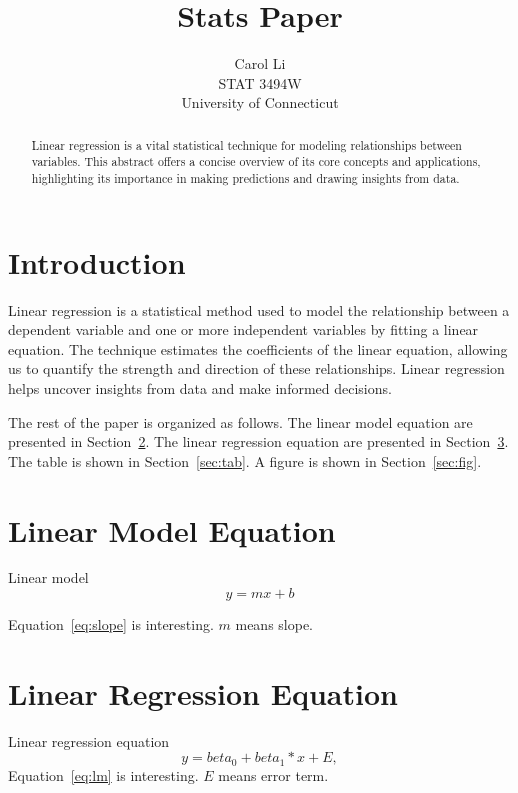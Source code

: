 \documentclass[12pt]{article}
\title{Stats Paper}
\author{Carol Li\\
    STAT 3494W\\
    University of Connecticut
}
\begin{document}

\begin{abstract}
  Linear regression is a vital statistical technique for modeling relationships between variables. 
  This abstract offers a concise overview of its core concepts and applications, highlighting its importance 
  in making predictions and drawing insights from data.
\end{abstract}


\section{Introduction}
\label{sec:intro}

Linear regression is a statistical method used to model the relationship between a dependent variable and 
one or more independent variables by fitting a linear equation. The technique estimates the coefficients of the linear 
equation, allowing us to quantify the strength and direction of these relationships. Linear regression helps uncover 
insights from data and make informed decisions.

\lipsum[1]


The rest of the paper is organized as follows.
The linear model equation are presented in Section~\ref{sec:eq}.
The linear regression equation are presented in Section~\ref{sec:eq2}.
The table is shown in Section~\ref{sec:tab}.
A figure is shown in Section~\ref{sec:fig}.


\section{Linear Model Equation}
\label{sec:eq}

Linear model
\begin{equation}
  \label{slope}
  y = mx + b
\end{equation}

Equation~\eqref{eq:slope} is interesting. $m$ means slope.  

\section{Linear Regression Equation}
\label{sec:eq2}

Linear regression equation
\begin{equation}
  \label{eq:lm}
  y = beta_0 + beta_1*x + E,
\end{equation}
Equation~\eqref{eq:lm} is interesting. $E$ means error term.  
\end{document}

